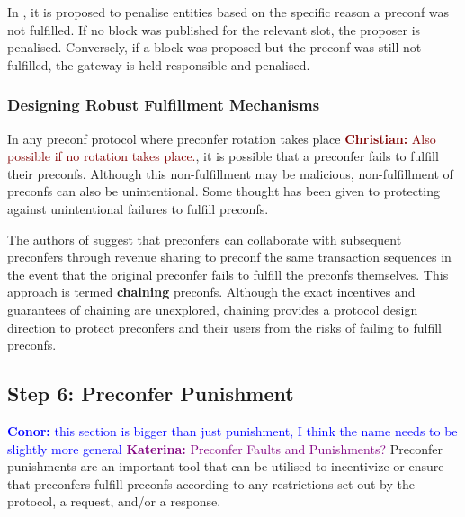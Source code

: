 \documentclass[a4paper]{article}
\theoremstyle{boldstyle}
\newcommand{\cm}[1]{\textcolor{blue}{\textbf{Conor:} #1}}
\newcommand{\dk}[1]{\textcolor{cyan}{\textbf{Demetris:} #1}}
\newcommand{\ks}[1]{\textcolor{purple}{\textbf{Katerina:} #1}}
\newcommand{\chm}[1]{\textcolor{Maroon}{\textbf{Christian:} #1}}
\begin{document}
In \cite{gateway_trust_liveness}, it is proposed to penalise entities based on the specific reason a preconf was not fulfilled. If no block was published for the relevant slot, the proposer is penalised. Conversely, if a block was proposed but the preconf was still not fulfilled, the gateway is held responsible and penalised.


\subsubsection{Designing Robust Fulfillment Mechanisms}\label{robust_delivery}

    In any preconf protocol where preconfer rotation takes place \chm{Also possible if no rotation takes place.}, it is possible that a preconfer fails to fulfill their preconfs. Although this non-fulfillment may be malicious, non-fulfillment of preconfs can also be unintentional. Some thought has been given to protecting against unintentional failures to fulfill preconfs.
    
     The authors of \cite{W:AvoidingAccidentalLivenessFaultsforBasedPreconfs} suggest that preconfers can collaborate with subsequent preconfers through revenue sharing to preconf the same transaction sequences in the event that the original preconfer fails to fulfill the preconfs themselves. This approach is termed \textbf{chaining} preconfs. Although the exact incentives and guarantees of chaining are unexplored, chaining provides a protocol design direction to protect preconfers and their users from the risks of failing to fulfill preconfs. 
     
    
\subsection{Step 6: Preconfer Punishment} \label{preconfer_punishment}    
    \cm{this section is bigger than just punishment, I think the name needs to be slightly more general} \ks{Preconfer Faults and Punishments?}
    Preconfer punishments are an important tool that can be utilised to incentivize or ensure that preconfers fulfill preconfs according to any restrictions set out by the protocol, a request, and/or a response.
    
\end{document}
